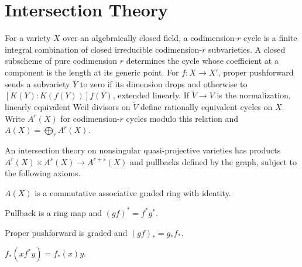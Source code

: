 \section{Intersection Theory}
\label{ha-appA-sec1}

\begin{definition}
For a variety $X$ over an algebraically closed field, a codimension-$r$ cycle
is a finite integral combination of closed irreducible codimension-$r$
subvarieties.  A closed subscheme of pure codimension $r$ determines the
cycle whose coefficient at a component is the length at its generic point.
For $f:X\to X'$, proper pushforward sends a subvariety $Y$ to zero if its
dimension drops and otherwise to $[K(Y):K(f(Y))]f(Y)$, extended linearly.
If $\widetilde V\to V$ is the normalization, linearly equivalent Weil
divisors on $\widetilde V$ define rationally equivalent cycles on $X$.
Write $A^r(X)$ for codimension-$r$ cycles modulo this relation and
$A(X)=\bigoplus_rA^r(X)$.
\end{definition}

An intersection theory on nonsingular quasi-projective varieties has products
$A^r(X)\times A^s(X)\to A^{r+s}(X)$ and pullbacks defined by the graph, subject
to the following axioms.

\begin{convention}
\label{ha-appA-A1}
$A(X)$ is a commutative associative graded ring with identity.
\end{convention}

\begin{convention}
\label{ha-appA-A2}
Pullback is a ring map and $(gf)^*=f^*g^*$.
\end{convention}

\begin{convention}
\label{ha-appA-A3}
Proper pushforward is graded and $(gf)_*=g_*f_*$.
\end{convention}

\begin{convention}
\label{ha-appA-A4}
$f_*(x f^*y)=f_*(x)y$.
\end{convention}

